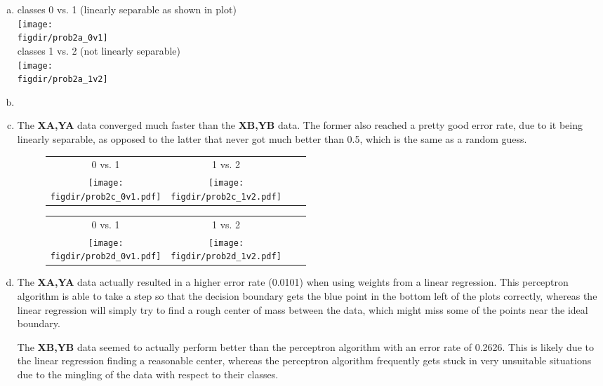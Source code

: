 \documentclass[twoside,11pt]{article}
\newcommand{\figdir}{figs}
\theoremstyle{definition}
\begin{document}
\begin{enumerate}[(a)]

\item classes 0 vs. 1 (linearly separable as shown in plot) \\
\texttt{[image: \\figdir/prob2a\_0v1]} \\
classes 1 vs. 2 (not linearly separable) \\
\texttt{[image: \\figdir/prob2a\_1v2]} \\

\item 

\item The \textbf{XA,YA} data converged much faster than the \textbf{XB,YB} data.
The former also reached a pretty good error rate, due to it being linearly separable, as opposed to the latter that never got much better than 0.5, which is the same as a random guess.
\begin{figure}[h!] \centering
\begin{tabular}{cccc}
0 vs. 1 & 1 vs. 2 \\
\texttt{[image: \\figdir/prob2c\_0v1.pdf]} &
\texttt{[image: \\figdir/prob2c\_1v2.pdf]}
\end{tabular}
\end{figure}

\begin{figure}[h!] \centering
\begin{tabular}{cccc}
0 vs. 1 & 1 vs. 2 \\
\texttt{[image: \\figdir/prob2d\_0v1.pdf]} &
\texttt{[image: \\figdir/prob2d\_1v2.pdf]}
\end{tabular}
\end{figure}

\item The \textbf{XA,YA} data actually resulted in a higher error rate (0.0101) when using weights from a linear regression.
This perceptron algorithm is able to take a step so that the decision boundary gets the blue point in the bottom left of the plots correctly, whereas the linear regression will simply try to find a rough center of mass between the data, which might miss some of the points near the ideal boundary.

The \textbf{XB,YB} data seemed to actually perform better than the perceptron algorithm with an error rate of 0.2626.
This is likely due to the linear regression finding a reasonable center, whereas the perceptron algorithm frequently gets stuck in very unsuitable situations due to the mingling of the data with respect to their classes.


\end{enumerate}
\end{document}
